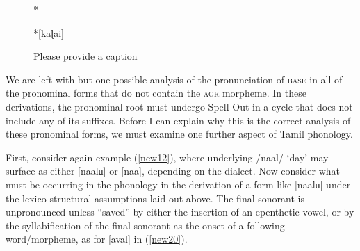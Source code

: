 \documentclass[output=paper]{langscibook}
\begin{document}
\begin{figure}
    \centering
    \begin{minipage}[t][][t]{.1\textwidth}
        *
    \end{minipage}
    \begin{minipage}[t]{.45\textwidth}
    \end{minipage}
    \begin{minipage}[t][][c]{.1\textwidth}
        \rightarrow 
    \end{minipage}
    \begin{minipage}[t]{.2\textwidth}
        *[kaɭai]
    \end{minipage}
    \caption{\color{red}Please provide a caption}
    \label{new19}
\end{figure}

We are left with but one possible analysis of the pronunciation of \textsc{base} in all of the pronominal forms that do not contain the \textsc{agr} morpheme. In these derivations, the pronominal root must undergo Spell Out in a cycle that does not include any of its suffixes. Before I can explain why this is the correct analysis of these pronominal forms, we must examine one further aspect of Tamil phonology. 

First, consider again example (\ref{new12}), where underlying /naal/ ‘day’ may surface as either  [naalʉ] or [naa], depending on the dialect. Now consider what must be occurring in the phonology in the derivation of a form like [naalʉ] under the lexico-structural assumptions laid out above. The final sonorant is unpronounced unless “saved” by either the insertion of an epenthetic vowel, or by the syllabification of the final sonorant as the onset of a following word/morpheme, as for [aval] in (\ref{new20}).
\end{document}
